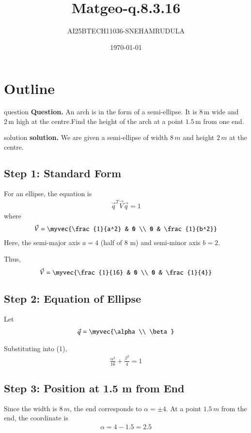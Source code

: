 \documentclass{beamer}
\title{Matgeo-q.8.3.16}
\author{AI25BTECH11036-SNEHAMRUDULA}
\date{\today}
\begin{document}
\begin{frame}
\titlepage
\end{frame}

\section*{Outline}
\begin{frame}{question}
\noindent\textbf{Question.}\;
An arch is in the form of a semi-ellipse. It is $8 \, \text{m}$ wide and $2 \, \text{m}$ high at the centre.Find the height of the arch at a point $1.5 \, \text{m}$ from one end.
\end{frame}
\begin{frame}{solution}
\noindent\textbf{solution.}\;
We are given a semi-ellipse of width $8\,m$ and height $2\,m$ at the centre.

\subsection*{Step 1: Standard Form}
For an ellipse, the equation is
\begin{align}
\vec{q}^T\vec{V}\vec{q} = 1
\end{align}
where
\begin{align}
\vec{V} = \myvec{\frac{1}{a^2} & 0 \\ 0 & \frac{1}{b^2}}
\end{align}
Here, the semi-major axis $a = 4$ (half of 8 m) and semi-minor axis $b = 2$.

Thus,
\begin{align}
\vec{V} = \myvec{\frac{1}{16} & 0 \\ 0 & \frac{1}{4}}
\end{align}

\subsection*{Step 2: Equation of Ellipse}
Let 
\begin{align}
\vec{q} = \myvec{\alpha \\ \beta}
\end{align}
\end{frame}
Substituting into (1),
\begin{align}
\frac{\alpha^2}{16} + \frac{\beta^2}{4} = 1
\end{align}

\subsection*{Step 3: Position at 1.5 m from End}
Since the width is $8\,m$, the end corresponds to $\alpha = \pm 4$.
At a point $1.5\,m$ from the end, the coordinate is
\begin{align}
\alpha = 4 - 1.5 = 2.5
\end{align}
\end{document}
